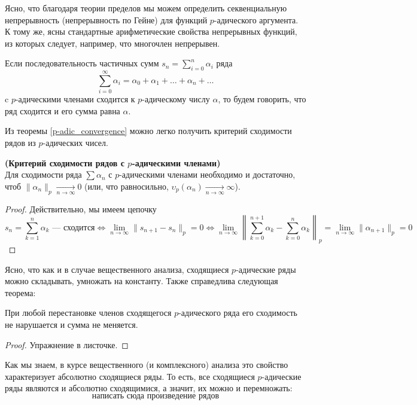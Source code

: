 \documentclass[11pt]{article}
\begin{document}
    Ясно, что благодаря теории пределов мы можем определить секвенциальную непрерывность (непрерывность по Гейне) для функций $p$-адического аргумента. \\
    К тому же, ясны стандартные арифметические свойства непрерывных функций, из которых следует, например, что многочлен непрерывен.

    \begin{definition}
        Если последовательность частичных сумм $s_n = \sum\limits_{i = 0}^{n} \alpha_i$ ряда
        \[ \sum\limits_{i = 0}^{\infty} \alpha_i = \alpha_0 + \alpha_1 + \ldots + \alpha_n + \ldots \]
        c $p$-адическими членами сходится к $p$-адическому числу $\alpha$, то будем говорить, что ряд сходится и его сумма равна $\alpha$.
    \end{definition}

    Из теоремы  \ref{p-adic_convergence} можно легко получить критерий сходимости рядов из $p$-адических чисел.

    \begin{theorem} \textbf{(Критерий сходимости рядов с $p$-адическими членами)}\\
        Для сходимости ряда $\sum \alpha_n$ с $p$-адическими членами необходимо и достаточно, чтоб $\| \alpha_n \|_p \xrightarrow[n \to \infty]{} 0$ (или, что равносильно,
        $ \upsilon_p{(\alpha_n)} \xrightarrow[n \to \infty]{} \infty$).
    \end{theorem}
    \begin{proof}
        Действительно, мы имеем цепочку
        \[ s_n = \sum\limits_{k = 1}^n \alpha_k \text{~--- сходится} \Leftrightarrow \lim\limits_{n \to \infty} \| s_{n + 1} - s_n \|_{p} = 0 \Leftrightarrow \lim\limits_{n \to \infty} \left\| \sum\limits_{k = 0}^{n + 1} \alpha_k - \sum\limits_{k = 0}^{n} \alpha_k \right\|_p = \lim\limits_{n \to \infty} \| \alpha_{n + 1} \|_{p} = 0 \]
    \end{proof}

    Ясно, что как и в случае вещественного анализа, сходящиеся $p$-адические ряды можно складывать, умножать на константу.
    Также справедлива следующая теорема:
    \begin{theorem}
        При любой перестановке членов сходящегося $p$-адического ряда его сходимость не нарушается и сумма не меняется.
    \end{theorem}
    \begin{proof}
        Упражнение в листочке.
    \end{proof}
    Как мы знаем, в курсе вещественного (и комплексного) анализа это свойство характеризует абсолютно сходящиеся ряды. То есть, все сходящиеся
    $p$-адические ряды являются и абсолютно сходящимися, а значит, их можно и перемножать:
    \[ \text{написать сюда произведение рядов} \]
\end{document}
